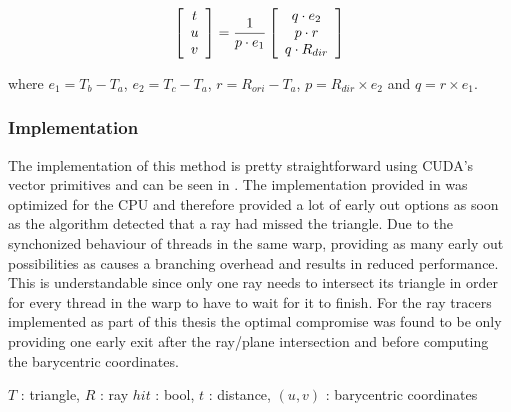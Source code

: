 \begin{displaymath}
  \left[\begin{array}{c} t \\ u \\ v \end{array}\right] = \frac{1}{p \cdot e_1} 
  \left[\begin{array}{c} q \cdot e_2 \\ p \cdot r \\ q \cdot R_{dir} \end{array}\right]
\end{displaymath}

where $e_1 = T_b - T_a$, $e_2 = T_c - T_a$, $r = R_{ori} - T_a$, $p = R_{dir} \times  e_2$
and $q = r \times  e_1$.

\subsubsection{Implementation}

The implementation of this method is pretty straightforward using CUDA's vector
primitives and can be seen in . The implementation
provided in  was optimized for the CPU and therefore
provided a lot of early out options as soon as the algorithm detected that a ray
had missed the triangle. Due to the synchonized behaviour of threads in the same
warp, providing as many early out possibilities as 
causes a branching overhead and results in reduced performance. This is
understandable since only one ray needs to intersect its triangle in order for
every thread in the warp to have to wait for it to finish. For the ray tracers
implemented as part of this thesis the optimal compromise was found to be only
providing one early exit after the ray/plane intersection and before computing
the barycentric coordinates.

\begin{algorithm}
  \caption{Möller-Trumbore ray/triangle intersection test}
  \label{alg:moellerTrumbore}
  \begin{algorithmic}
              {$T$ : triangle, $R$ : ray}
              {$hit$ : bool, $t$ : distance, $(u,v)$ : barycentric coordinates}
              {
                \ELSE
                \ENDIF
              }
  \end{algorithmic}
\end{algorithm}


